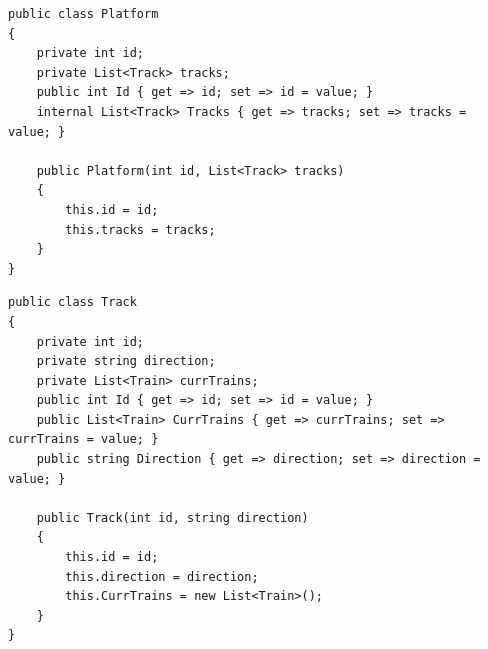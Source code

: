 \begin{lstlisting}[caption={Класс Platform}, label={lst:platform}]
public class Platform
{
	private int id;
	private List<Track> tracks;
	public int Id { get => id; set => id = value; }
	internal List<Track> Tracks { get => tracks; set => tracks = value; }
	
	public Platform(int id, List<Track> tracks)
	{
		this.id = id;
		this.tracks = tracks;
	}
}
\end{lstlisting}

\begin{lstlisting}[caption={Класс Track}, label={lst:track}]
public class Track
{
	private int id;
	private string direction;
	private List<Train> currTrains;
	public int Id { get => id; set => id = value; }
	public List<Train> CurrTrains { get => currTrains; set => currTrains = value; }
	public string Direction { get => direction; set => direction = value; }
	
	public Track(int id, string direction)
	{
		this.id = id;
		this.direction = direction;
		this.CurrTrains = new List<Train>();
	}
}
\end{lstlisting}


